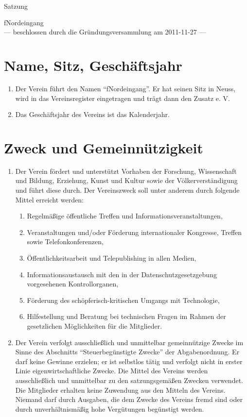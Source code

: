 \documentclass[ngerman]{scrartcl}
\begin{document}
\renewcommand*{\othersectionlevelsformat}[3]{\S#3\autodot\enskip}
\begin{titlepage}
\centerline{\Large Satzung}
\begin{center}
{\Huge fNordeingang}\\[5mm]
\vfill
--- beschlossen durch die Gründungsversammlung am 2011-11-27 ---
\end{center}
\end{titlepage}
\section{Name, Sitz, Geschäftsjahr} \label{sec:name_sitz_geschaeftsjahr}
\begin{enumerate}
 \item Der Verein führt den Namen "`fNordeingang"'. Er hat
 seinen Sitz in Neuss, wird in das Vereinsregister
 eingetragen und trägt dann den Zusatz e. V.
 \item Das Geschäftsjahr des Vereins ist das Kalenderjahr.
\end{enumerate}
\section{Zweck und Gemeinnützigkeit} \label{sec:zweck}
\begin{enumerate}
 \item Der Verein fördert und unterstützt Vorhaben der 
Forschung, Wissenschaft und Bildung, Erziehung, Kunst und Kultur 
sowie der Völkerverständigung und führt diese durch. 
Der Vereinszweck soll unter anderem durch folgende Mittel erreicht werden:
\begin{enumerate}
 \item Regelmäßige öffentliche Treffen und Informationsveranstaltungen,
 \item Veranstaltungen und/oder Förderung internationaler Kongresse, Treffen sowie Telefonkonferenzen,
 \item Öffentlichkeitsarbeit und Telepublishing in allen Medien,
 \item Informationsaustausch mit den in der Datenschutzgesetzgebung vorgesehenen Kontrollorganen,
 \item Förderung des schöpferisch-kritischen Umgangs mit Technologie,
 \item Hilfestellung und Beratung bei technischen Fragen im Rahmen der gesetzlichen Möglichkeiten für die Mitglieder.\
\end{enumerate}
\item Der Verein verfolgt ausschließlich und unmittelbar gemeinnützige Zwecke 
im Sinne des Abschnitts ``Steuerbegünstigte Zwecke'' der Abgabenordnung. 
Er darf keine Gewinne erzielen; er ist selbstlos tätig und verfolgt 
nicht in erster Linie eigenwirtschaftliche Zwecke. Die Mittel des Vereins werden ausschließlich und unmittelbar zu den satzungsgemäßen 
Zwecken verwendet. Die Mitglieder erhalten keine Zuwendung aus den 
Mitteln des Vereins. Niemand darf durch Ausgaben, die dem Zwecke des 
Vereins fremd sind oder durch unverhältnismäßig hohe Vergütungen begünstigt werden.
\end{enumerate}
\end{document}
